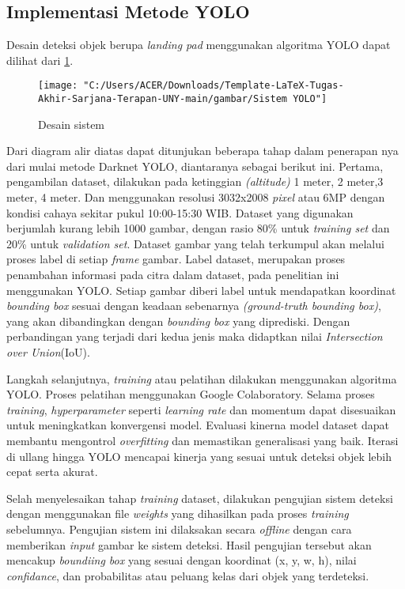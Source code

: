 \subsection{Implementasi Metode YOLO}
Desain deteksi objek berupa \textit{landing pad} menggunakan algoritma YOLO dapat dilihat dari \cref{fig:sistem-yolo}.

\begin{figure}[H]
	\centering
	\texttt{[image: "C:/Users/ACER/Downloads/Template-LaTeX-Tugas-Akhir-Sarjana-Terapan-UNY-main/gambar/Sistem YOLO"]}
	\caption{Desain sistem}
	\label{fig:sistem-yolo}
\end{figure}

Dari diagram alir diatas dapat ditunjukan beberapa tahap dalam penerapan nya dari mulai metode Darknet YOLO, diantaranya sebagai berikut ini. Pertama, pengambilan dataset, dilakukan pada ketinggian \textit{(altitude)} 1 meter, 2 meter,3 meter, 4 meter. Dan menggunakan resolusi 3032x2008 \textit{pixel} atau 6MP dengan kondisi cahaya sekitar pukul 10:00-15:30 WIB. Dataset yang digunakan berjumlah kurang lebih 1000 gambar, dengan rasio 80\% untuk \textit{training set} dan 20\% untuk \textit{validation set}. Dataset gambar yang telah terkumpul akan melalui proses label di setiap \textit{frame} gambar. Label dataset, merupakan proses penambahan informasi pada citra dalam dataset, pada penelitian ini menggunakan YOLO. Setiap gambar diberi label untuk mendapatkan koordinat \textit{bounding box} sesuai dengan keadaan sebenarnya \textit{(ground-truth bounding box)}, yang akan dibandingkan dengan \textit{bounding box} yang diprediski. Dengan perbandingan yang terjadi dari kedua jenis maka didaptkan nilai \textit{Intersection over Union}(IoU).

Langkah selanjutnya, \textit{training} atau pelatihan dilakukan menggunakan algoritma YOLO. Proses pelatihan menggunakan Google Colaboratory. Selama proses \textit{training}, \textit{hyperparameter} seperti \textit{learning rate} dan momentum dapat disesuaikan untuk meningkatkan konvergensi model. Evaluasi kinerna model dataset dapat membantu mengontrol \textit{overfitting} dan memastikan generalisasi yang baik. Iterasi di ullang hingga YOLO mencapai kinerja yang sesuai untuk deteksi objek lebih cepat serta akurat. 

Selah menyelesaikan tahap \textit{training} dataset, dilakukan pengujian sistem deteksi dengan menggunakan file \textit{weights} yang dihasilkan pada proses \textit{training} sebelumnya. Pengujian sistem ini dilaksakan secara \textit{offline} dengan cara memberikan \textit{input} gambar ke sistem deteksi. Hasil pengujian tersebut akan mencakup \textit{boundiing box} yang sesuai dengan koordinat (x, y, w, h), nilai \textit{confidance}, dan probabilitas atau peluang kelas dari objek yang terdeteksi.

